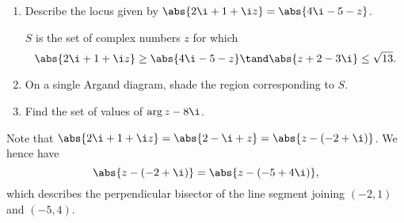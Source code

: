\begin{problem}
    \begin{enumerate}
        \item Describe the locus given by $\abs{2\i + 1 + \i z} = \abs{4\i - 5 - z}$.

        $S$ is the set of complex numbers $z$ for which \[\abs{2\i + 1 + \i z} \geq \abs{4\i - 5 - z} \tand \abs{z + 2 - 3\i} \leq \sqrt{13}.\]
        \item On a single Argand diagram, shade the region corresponding to $S$.
        \item Find the set of values of $\arg{z - 8\i}$.
    \end{enumerate}
\end{problem}
\begin{solution}
    \begin{ppart}
        Note that $\abs{2\i + 1 + \i z} = \abs{2 - \i + z} = \abs{z - (-2 + \i)}$. We hence have \[\abs{z - (-2 + \i)} = \abs{z - (-5 + 4\i)},\] which describes the perpendicular bisector of the line segment joining $(-2, 1)$ and $(-5, 4)$.
    \end{ppart}
    \clearpage
    \begin{ppart}
        \begin{center}
\end{center}
\end{ppart}
\end{solution}

